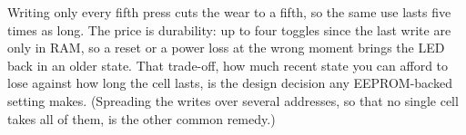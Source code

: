 Writing only every fifth press cuts the wear to a fifth, so the same use lasts five times as long.
The price is durability: up to four toggles since the last write are only in RAM, so a reset or a
power loss at the wrong moment brings the LED back in an older state. That trade-off, how much
recent state you can afford to lose against how long the cell lasts, is the design decision any
EEPROM-backed setting makes. (Spreading the writes over several addresses, so that no single cell
takes all of them, is the other common remedy.)

